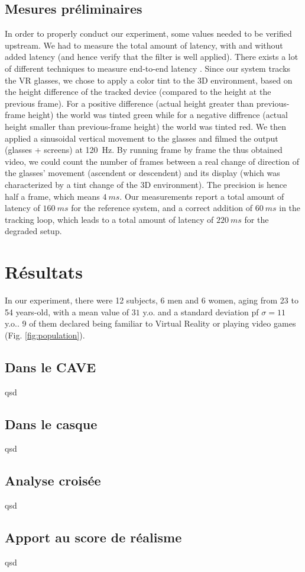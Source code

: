 	\section{Mesures préliminaires}
	\par In order to properly conduct our experiment, some values needed to be verified upstream. We had to measure the total amount of latency, with and without added latency (and hence verify that the filter is well applied). There exists a lot of different techniques to measure end-to-end latency \cite{papadakis_system_2011}. Since our system tracks the VR glasses, we chose to apply a color tint to the 3D environment, based on the height difference of the tracked device (compared to the height at the previous frame). For a positive difference (actual height greater than previous-frame height) the world was tinted green while for a negative diffrence (actual height smaller than previous-frame height) the world was tinted red. We then applied a sinusoidal vertical movement to the glasses and filmed the output (glasses + screens) at 120~Hz. By running frame by frame the thus obtained video, we could count the number of frames between a real change of direction of the glasses' movement (ascendent or descendent) and its display (which was characterized by a tint change of the 3D environment). The precision is hence half a frame, which means $4~ms$. Our measurements report a total amount of latency of $160~ms$ for the reference system, and a correct addition of $60~ms$ in the tracking loop, which leads to a total amount of latency of $220~ms$ for the degraded setup.
	
\chapter{Résultats}
	\par In our experiment, there were 12 subjects, 6 men and 6 women, aging from 23 to 54 years-old, with a mean value of $31$ y.o. and a standard deviation pf $\sigma = 11$ y.o.. 9 of them declared being familiar to Virtual Reality or playing video games (Fig. \ref{fig:population}).

	
	\section{Dans le CAVE}
	\par qsd
	
	\section{Dans le casque}
	\par qsd
	
	\section{Analyse croisée}
	\par qsd
	
	\section{Apport au score de réalisme}
	\par qsd